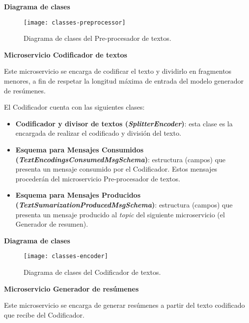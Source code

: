 \noindent
\textbf{Diagrama de clases}

\begin{figure}[h]
	\centering
	\texttt{[image: classes-preprocessor]}
	\vspace{-0.5cm}
	\caption{Diagrama de clases del Pre-procesador de textos.}
\end{figure}


\noindent
\textbf{\large Microservicio Codificador de textos}

Este microservicio se encarga de codificar el texto y dividirlo en fragmentos menores, a fin de respetar la longitud máxima de entrada del modelo generador de resúmenes.

El Codificador cuenta con las siguientes clases:

\vspace{-0.2cm}
\begin{itemize} [\textbullet]
	\item \textbf{Codificador y divisor de textos (\emph{SplitterEncoder})}: esta clase es la encargada de realizar el codificado y división del texto.
	
	\item \textbf{Esquema para Mensajes Consumidos \\ (\emph{TextEncodingsConsumedMsgSchema})}: estructura (campos) que presenta un mensaje consumido por el Codificador. Estos mensajes procederán del microservicio Pre-procesador de textos.
	
	\item \textbf{Esquema para Mensajes Producidos \\ (\emph{TextSumarizationProducedMsgSchema})}: estructura (campos) que presenta un mensaje producido al \emph{topic} del siguiente microservicio (el Generador de resumen).
\end{itemize}

\noindent
\textbf{Diagrama de clases}

\begin{figure}[h]
	\centering
	\texttt{[image: classes-encoder]}
	\vspace{-0.5cm}
	\caption{Diagrama de clases del Codificador de textos.}
\end{figure}


\noindent
\textbf{\large Microservicio Generador de resúmenes}

Este microservicio se encarga de generar resúmenes a partir del texto codificado que recibe del Codificador.

